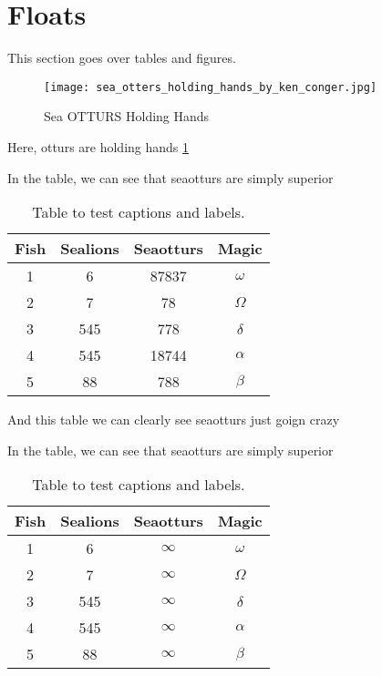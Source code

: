\section{Floats}
This section goes over tables and figures.

\begin{figure}[H] %
	\centering
	\texttt{[image: sea\_otters\_holding\_hands\_by\_ken\_conger.jpg]}
	\caption{Sea OTTURS Holding Hands}
	\label{fig:sealion}
\end{figure}

Here, otturs are holding hands \ref{fig:sealion}

In the table, we can see that seaotturs are simply superior
\begin{table}[H]
	\centering
	\begin{tabular}{||c c c c||} 
		\hline
		Fish & Sealions & Seaotturs & Magic \\ [0.5ex] 
		\hline\hline
		1 & 6 & 87837 & $\omega$ \\ 
		2 & 7 & 78 & $\Omega$  \\
		3 & 545 & 778 & $\delta$  \\
		4 & 545 & 18744 & $\alpha$  \\
		5 & 88 & 788 & $\beta$  \\ [1ex] 
		\hline
	\end{tabular}
	\caption{Table to test captions and labels. \cite{Otturs2020}}
	\label{table:1}
\end{table}

And this table we can clearly see seaotturs just goign crazy

In the table, we can see that seaotturs are simply superior
\begin{table}[H]
	\centering
	\begin{tabular}{||c c c c||} 
		\hline
		Fish & Sealions & Seaotturs & Magic \\ 
		\hline\hline
		1 & 6 & $\infty$ & $\omega$ \\ 
		2 & 7 & $\infty$ & $\Omega$  \\
		3 & 545 & $\infty$ & $\delta$  \\
		4 & 545 & $\infty$ & $\alpha$  \\
		5 & 88 & $\infty$ & $\beta$  \\
		\hline
	\end{tabular}
	\caption{Table to test captions and labels. \cite{Otturs2020}}
	\label{table:2}
\end{table}
